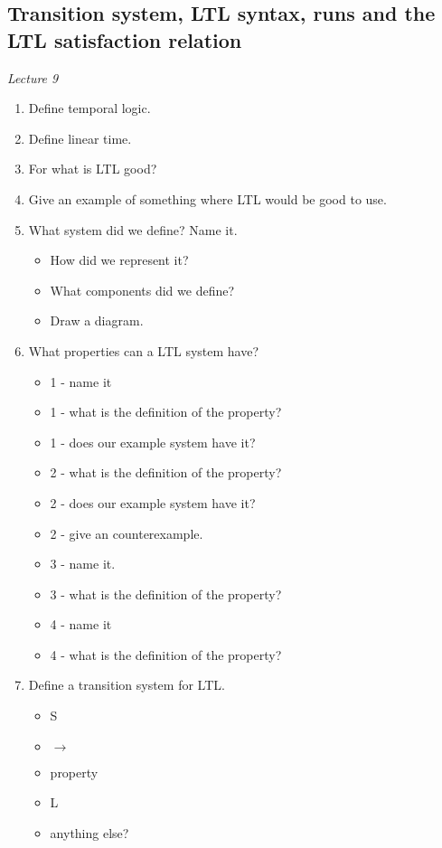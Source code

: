 \documentclass[fleqn]{article}
\begin{document}
\subsection{Transition system, LTL syntax, runs and the LTL satisfaction relation}
\textit{Lecture 9}
\begin{enumerate}
    \item Define temporal logic.
    \item Define linear time.
    \item For what is LTL good?
    \item Give an example of something where LTL would be good to use.
    \item What system did we define? Name it.
    \begin{itemize}
        \item How did we represent it? 
        \item What components did we define?
        \item Draw a diagram.
    \end{itemize}
    \item What properties can a LTL system have?
    \begin{itemize}
        \item 1 - name it
        \item 1 - what is the definition of the property?
        \item 1 - does our example system have it? 
        \item 2 - what is the definition of the property?
        \item 2 - does our example system have it?
        \item 2 - give an counterexample.
        \item 3 - name it.
        \item 3 - what is the definition of the property?
        \item 4 - name it 
        \item 4 - what is the definition of the property?
    \end{itemize}
    \item Define a transition system for LTL.
    \begin{itemize}
        \item S
        \item $\rightarrow$
        \item property
        \item L
        \item anything else?

\end{itemize}
\end{enumerate}
\end{document}

